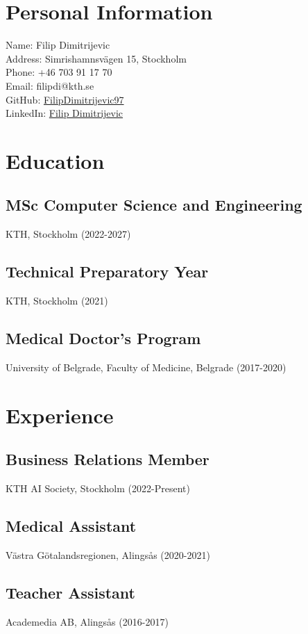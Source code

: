 \documentclass{article}
\begin{document}
\section*{Personal Information}
Name: Filip Dimitrijevic \\
Address: Simrishamnsvägen 15, Stockholm \\
Phone: +46 703 91 17 70 \\
Email: filipdi@kth.se \\
GitHub: \href{https://github.com/FilipDimitrijevic97}{FilipDimitrijevic97} \\
LinkedIn: \href{https://www.linkedin.com/in/filip-dimitrijevic-6b0543215/}{Filip Dimitrijevic}

\section*{Education}
\subsection*{MSc Computer Science and Engineering}
KTH, Stockholm (2022-2027)

\subsection*{Technical Preparatory Year}
KTH, Stockholm (2021)

\subsection*{Medical Doctor's Program}
University of Belgrade, Faculty of Medicine, Belgrade (2017-2020)

\section*{Experience}
\subsection*{Business Relations Member}
KTH AI Society, Stockholm (2022-Present)

\subsection*{Medical Assistant}
Västra Götalandsregionen, Alingsås (2020-2021)

\subsection*{Teacher Assistant}
Academedia AB, Alingsås (2016-2017)
\end{document}
